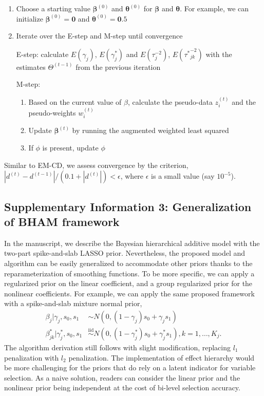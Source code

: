 \documentclass[
]{article}
\providecommand{\tightlist}{%
  \setlength{\itemsep}{0pt}\setlength{\parskip}{0pt}}
\begin{document}
\begin{enumerate}
\def\labelenumi{\arabic{enumi})}
\item
  Choose a starting value \(\boldsymbol{\beta}^{(0)}\) and
  \(\boldsymbol{\theta}^{(0)}\) for \(\boldsymbol{\beta}\) and
  \(\boldsymbol{\theta}\). For example, we can initialize
  \(\boldsymbol{\beta}^{(0)} = \boldsymbol{0}\) and
  \(\boldsymbol{\theta}^{(0)} = \boldsymbol{0}.5\)
\item
  Iterate over the E-step and M-step until convergence

  E-step: calculate \(E(\gamma_{j})\), \(E(\gamma^*_{j})\) and
  \(E(\tau^{-2}_{j})\), \(E({\tau^*}^{-2}_{jk})\) with the estimates
  \(\Theta^{(t-1)}\) from the previous iteration

  M-step:

  \begin{enumerate}
  \def\labelenumii{\alph{enumii})}
  \tightlist
  \item
    Based on the current value of \(\beta\), calculate the pseudo-data
    \(z_i^{(t)}\) and the pseudo-weights \(w_i^{(t)}\)
  \item
    Update \(\boldsymbol{\beta}^{(t)}\) by running the augmented
    weighted least squared
  \item
    If \(\phi\) is present, update \(\phi\)
  \end{enumerate}
\end{enumerate}

Similar to EM-CD, we assess convergence by the criterion,
\(|d^{(t)}-d^{(t-1)}|/(0.1+|d^{(t)}|)<\epsilon\), where \(\epsilon\) is
a small value (say \(10^{-5}\)).

\subsection{Supplementary Information 3: Generalization of BHAM framework}

In the manuscript, we describe the Bayesian hierarchical additive model
with the two-part spike-and-slab LASSO prior. Nevertheless, the proposed
model and algorithm can be easily generalized to accommodate other
priors thanks to the reparameterization of smoothing functions. To be
more specific, we can apply a regularized prior on the linear
coefficient, and a group regularized prior for the nonlinear
coefficients. For example, we can apply the same proposed framework with
a spike-and-slab mixture normal prior, \begin{align*}
  \beta_{j} |\gamma_{j},s_0,s_1 &\sim N(0,(1-\gamma_{j}) s_0 + \gamma_{j} s_1)\\
  \beta^*_{jk} | \gamma^*_{j},s_0,s_1 &\overset{\text{iid}}{\sim}N(0,(1-\gamma^*_{j}) s_0 + \gamma^*_{j} s_1), k=1,\dots, K_j.
\end{align*} The algorithm derivation still follows with slight
modification, replacing \(l_1\) penalization with \(l_2\) penalization.
The implementation of effect hierarchy would be more challenging for the
priors that do rely on a latent indicator for variable selection. As a
naive solution, readers can consider the linear prior and the nonlinear
prior being independent at the cost of bi-level selection accuracy.
\end{document}
